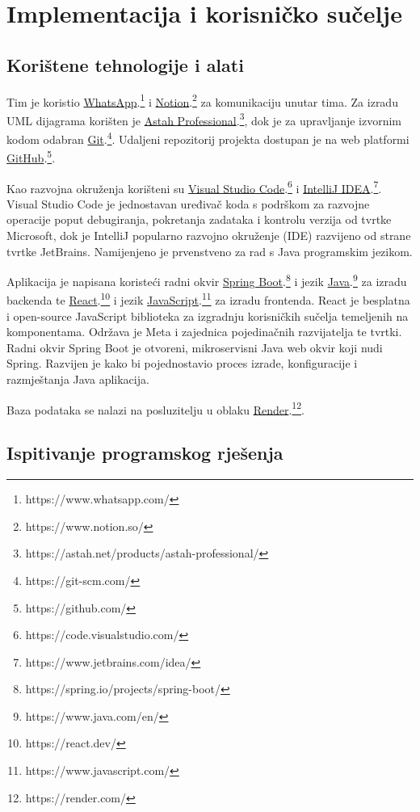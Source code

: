 \chapter{Implementacija i korisničko sučelje}
		
		
		\section{Korištene tehnologije i alati}
		
			Tim je koristio \underline{WhatsApp}.\footnote[1]{https://www.whatsapp.com/} i \underline{Notion}.\footnote[2]{https://www.notion.so/} za komunikaciju unutar tima. Za izradu UML dijagrama korišten je \underline{Astah Professional}.\footnote[3]{https://astah.net/products/astah-professional/}, dok je za upravljanje izvornim kodom odabran \underline{Git}.\footnote[4]{https://git-scm.com/}. Udaljeni repozitorij projekta dostupan je na web platformi \underline{GitHub}.\footnote[5]{https://github.com/}.
			
			Kao razvojna okruženja korišteni su \underline{Visual Studio Code}.\footnote[6]{https://code.visualstudio.com/} i \underline{IntelliJ IDEA}.\footnote[7]{https://www.jetbrains.com/idea/}. Visual Studio Code je jednostavan uređivač koda s podrškom za razvojne operacije poput debugiranja, pokretanja zadataka i kontrolu verzija od tvrtke Microsoft, dok je IntelliJ popularno razvojno okruženje (IDE) razvijeno od strane tvrtke JetBrains. Namijenjeno je prvenstveno za rad s Java programskim jezikom.
			
			Aplikacija je napisana koristeći radni okvir \underline{Spring Boot}.\footnote[8]{https://spring.io/projects/spring-boot/} i jezik \underline{Java}.\footnote[9]{https://www.java.com/en/} za izradu backenda te \underline{React}.\footnote[10]{https://react.dev/} i jezik \underline{JavaScript}.\footnote[11]{https://www.javascript.com/} za izradu frontenda. React je besplatna i open-source JavaScript biblioteka za izgradnju korisničkih sučelja temeljenih na komponentama. Održava je Meta i zajednica pojedinačnih razvijatelja te tvrtki. Radni okvir Spring Boot je otvoreni, mikroservisni Java web okvir koji nudi Spring. Razvijen je kako bi pojednostavio proces izrade, konfiguracije i razmještanja Java aplikacija. 
			
			Baza podataka se nalazi na posluzitelju u oblaku \underline{Render}.\footnote[12]{https://render.com/}.
			
			
			\eject 
		
	
		\section{Ispitivanje programskog rješenja}

